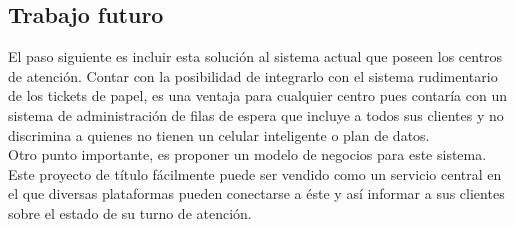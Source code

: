 \subsection{Trabajo futuro}

El paso siguiente es incluir esta solución al sistema actual que poseen los centros de atención. Contar con la posibilidad de integrarlo con el sistema rudimentario de los tickets de papel, es una ventaja para cualquier centro pues contaría con un sistema de administración de filas de espera que incluye a todos sus clientes y no discrimina a quienes no tienen un celular inteligente o plan de datos.\\

Otro punto importante, es proponer un modelo de negocios para este sistema. Este proyecto de título fácilmente puede ser vendido como un servicio central en el que diversas plataformas pueden conectarse a éste y así informar a sus clientes sobre el estado de su turno de atención.\\